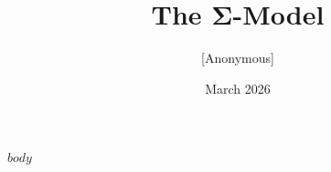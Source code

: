 \documentclass[11pt,a4paper]{article}
\title{The Σ-Model}
\author{[Anonymous]}
\date{March 2026}
\begin{document}
\maketitle

$body$



\end{document}
